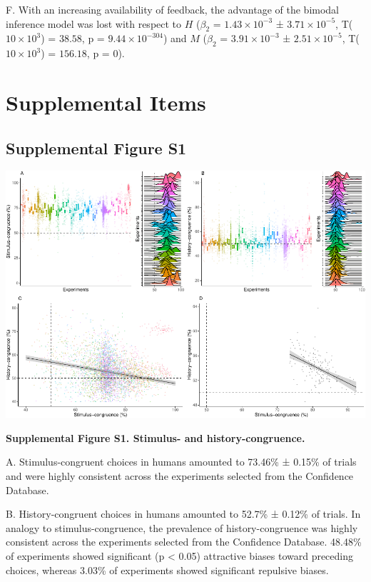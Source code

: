 \documentclass[
]{article}
\begin{document}
F. With an increasing availability of feedback, the advantage of the
bimodal inference model was lost with respect to \(H\) (\(\beta_2\) =
\(\ensuremath{1.43\times 10^{-3}}\) ±
\(\ensuremath{3.71\times 10^{-5}}\), T(\(\ensuremath{10\times 10^{3}}\))
= \(38.58\), p = \(\ensuremath{9.44\times 10^{-304}}\)) and \(M\)
(\(\beta_2\) = \(\ensuremath{3.91\times 10^{-3}}\) ±
\(\ensuremath{2.51\times 10^{-5}}\), T(\(\ensuremath{10\times 10^{3}}\))
= \(156.18\), p = \(0\)).

\newpage

\hypertarget{supplemental-items}{%
\section{Supplemental Items}\label{supplemental-items}}

\hypertarget{supplemental-figure-s1}{%
\subsection{Supplemental Figure S1}\label{supplemental-figure-s1}}

\includegraphics{modes_mouse_files/figure-latex/Supplememtal_Figure_S1-1.pdf}

\textbf{Supplemental Figure S1. Stimulus- and history-congruence.}

A. Stimulus-congruent choices in humans amounted to 73.46\% ± 0.15\% of
trials and were highly consistent across the experiments selected from
the Confidence Database.

B. History-congruent choices in humans amounted to 52.7\% ± 0.12\% of
trials. In analogy to stimulus-congruence, the prevalence of
history-congruence was highly consistent across the experiments selected
from the Confidence Database. 48.48\% of experiments showed significant
(p \textless{} 0.05) attractive biases toward preceding choices, whereas
3.03\% of experiments showed significant repulsive biases.
\end{document}
